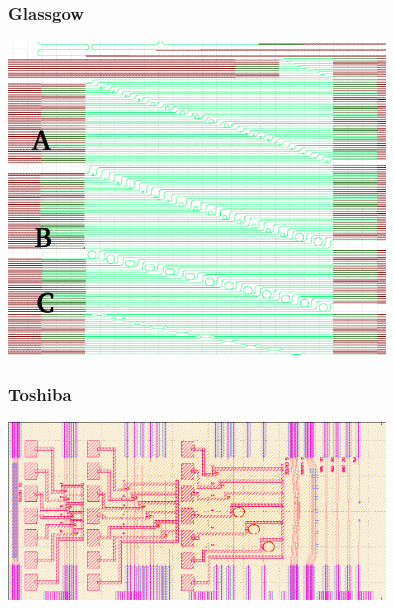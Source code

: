 \subsubsection{Glassgow}
\begingroup
    \centering  
    \includegraphics[width=10cm]{img/method/glassgowChipNumbering.png}
     \vspace{3pt} \label{crossCompare}
\endgroup
\subsubsection{Toshiba}
\begingroup
    \centering  
    \includegraphics[width=10cm]{img/method/toshiba.png}
     \vspace{3pt} \label{crossCompare}
\endgroup
